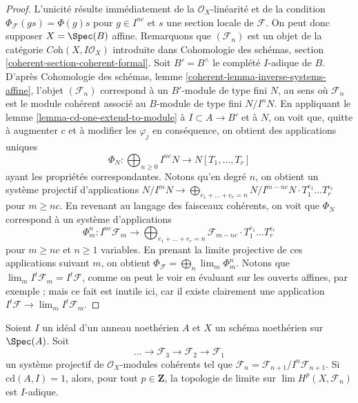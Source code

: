 \begin{proof}
L'unicité résulte immédiatement de la $\mathcal{O}_X$-linéarité
et de la condition $\Phi_\mathcal{F}(g s) = \Phi(g) s$ pour
$g \in I^{nc}$ et $s$ une section locale de $\mathcal{F}$.
On peut donc supposer $X = \Spec(B)$ affine.
Remarquons que $(\mathcal{F}_n)$ est un objet de la catégorie
$\textit{Coh}(X, I\mathcal{O}_X)$ introduite
dans Cohomologie des schémas, section \ref{coherent-section-coherent-formal}.
Soit $B' = B^\wedge$ le complété $I$-adique de $B$.
D'après Cohomologie des schémas, lemme \ref{coherent-lemma-inverse-systems-affine},
l'objet $(\mathcal{F}_n)$ correspond à un $B'$-module de type fini $N$,
au sens où $\mathcal{F}_n$ est le module cohérent
associé au $B$-module de type fini $N/I^n N$.
En appliquant le lemme \ref{lemma-cd-one-extend-to-module}
à $I \subset A \to B'$ et à $N$,
on voit que, quitte à augmenter $c$ et à modifier les
$\varphi_j$ en conséquence, on obtient des applications uniques
$$
\Phi_N : \bigoplus\nolimits_{n \geq 0} I^{nc}N \to N[T_1, \ldots, T_r]
$$
ayant les propriétés correspondantes. Notons qu'en degré $n$, on obtient
un système projectif d'applications $N/I^mN \to \bigoplus_{e_1 + \ldots + e_r = n}
N/I^{m - nc}N \cdot T_1^{e_1} \ldots T_r^{e_r}$ pour $m \geq nc$.
En revenant au langage des faisceaux
cohérents, on voit que $\Phi_N$ correspond à un système d'applications
$$
\Phi^n_m :
I^{nc}\mathcal{F}_m
\longrightarrow
\bigoplus\nolimits_{e_1 + \ldots + e_r = n}
\mathcal{F}_{m - nc} \cdot T_1^{e_1} \ldots T_r^{e_r}
$$
pour $m \geq nc$ et $n \geq 1$ variables. En prenant la limite projective
de ces applications suivant $m$, on obtient $\Phi_\mathcal{F} = \bigoplus_n \lim_m \Phi^n_m$.
Notons que $\lim_m I^t\mathcal{F}_m = I^t \mathcal{F}$, comme on peut le voir
en évaluant sur les ouverts affines, par exemple ; mais ce fait est inutile ici, car
il existe clairement une application $I^t\mathcal{F} \to \lim_m I^t\mathcal{F}_m$.
\end{proof}

\begin{lemma}
\label{lemma-topology-I-adic}
Soient $I$ un idéal d'un anneau noethérien $A$ et $X$ un schéma noethérien
sur $\Spec(A)$. Soit
$$
\ldots \to \mathcal{F}_3 \to \mathcal{F}_2 \to \mathcal{F}_1
$$
un système projectif de $\mathcal{O}_X$-modules cohérents
tel que $\mathcal{F}_n = \mathcal{F}_{n + 1}/I^n\mathcal{F}_{n + 1}$.
Si $\text{cd}(A, I) = 1$, alors, pour tout $p \in \mathbf{Z}$, la topologie de limite sur
$\lim H^p(X, \mathcal{F}_n)$ est $I$-adique.
\end{lemma}

